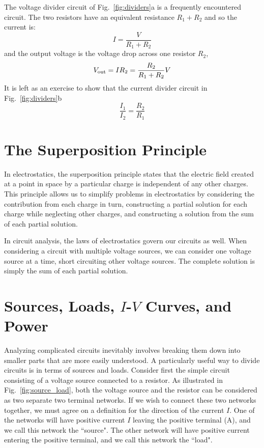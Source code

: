 The voltage divider circuit of Fig.~\ref{fig:dividers}a is a frequently encountered circuit.  The two resistors have an equivalent resistance $R_1 + R_2$ and so the current is:
\begin{displaymath}
I = \frac{V}{R_1 + R_2} 
\end{displaymath}
and the output voltage is the voltage drop across one resistor $R_2$, 
\begin{displaymath}
V_{\rm out} = I R_2 = \frac{R_2}{R_1 + R_2} V
\end{displaymath}
It is left as an exercise to show that the current divider circuit in Fig.~\ref{fig:dividers}b 
\begin{equation} \label{eqn:idivider}
\frac{I_1}{I_2} = \frac{R_2}{R_1}
\end{equation}

\section{The Superposition Principle}

In electrostatics, the superposition principle states that the electric field created at a point in space by a particular charge is independent of any other charges.  This principle allows us to simplify problems in electrostatics by considering the contribution from each charge in turn, constructing a partial solution for each charge while neglecting other charges, and constructing a solution from the sum of each partial solution.

In circuit analysis, the laws of electrostatics govern our circuits as well.  When considering a circuit with multiple voltage sources, we can consider one voltage source at a time, short circuiting other voltage sources.  The complete solution is simply the sum of each partial solution.

\section{Sources, Loads, $I$-$V$ Curves, and Power}

Analyzing complicated circuits inevitably involves breaking them down into smaller parts that are more easily understood.   A particularly useful way to divide circuits is in terms of sources and loads.  Consider first the simple circuit consisting of a voltage source connected to a resistor.  As illustrated in Fig.~\ref{fig:source_load}, both the voltage source and the resistor can be considered as two separate two terminal networks.  If we wish to connect these two networks together, we must agree on a definition for the direction of the current $I$.  One of the networks will have positive current $I$ leaving the positive terminal (A), and we call this network the ``source".  The other network will have positive current entering the positive terminal, and we call this network the ``load".  

